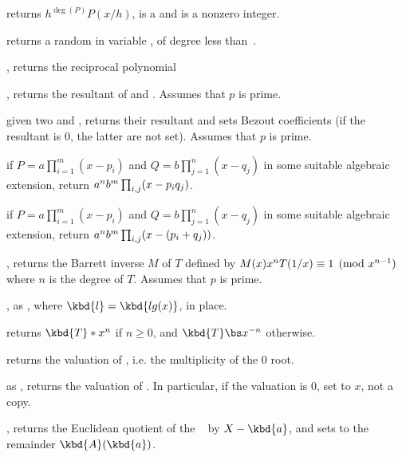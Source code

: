  returns $h^{\deg(P)} P(x/h)$,
 is a  and  is a nonzero integer.

 returns a random 
in variable , of degree less than~.

, returns the reciprocal polynomial

, returns the resultant
of  and . Assumes that $p$ is prime.


given two   and ,
returns their resultant and sets Bezout coefficients (if the resultant is $0$,
the latter are not set). Assumes that $p$ is prime.


 if
$P=a\prod_{i=1}^m(x-p_i)$ and $Q=b\prod_{j=1}^n(x-q_j)$ in some suitable
algebraic extension, return $a^n\*b^m\prod_{i,j}(x-p_i\*q_j)$.

 if
$P=a\prod_{i=1}^m(x-p_i)$ and $Q=b\prod_{j=1}^n(x-q_j)$ in some suitable
algebraic extension, return $a^n\*b^m\prod_{i,j}(x-(p_i+q_j))$.

, returns the Barrett inverse
$M$ of $T$ defined by $M(x)\*x^n\*T(1/x)\equiv 1\pmod{x^{n-1}}$ where $n$ is
the degree of $T$. Assumes that $p$ is prime.

, as , where
$\kbd{l} = \kbd{lg(x)}$, in place.

 returns $\kbd{T} * x^n$ if $n\geq 0$,
and $\kbd{T} \bs x^{-n}$ otherwise.

 returns the valuation of , i.e. the
multiplicity of the $0$ root.

 as , returns the
valuation of . In particular, if the valuation is $0$, set 
to $x$, not a copy.

, returns the
Euclidean quotient of the ~ by $X - \kbd{a}$, and sets
 to the remainder $ \kbd{A}(\kbd{a})$.

